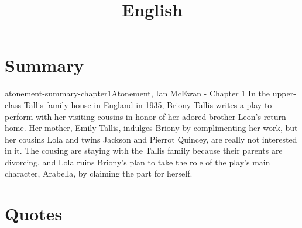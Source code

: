 \documentclass[preview]{standalone}
\begin{document}
\title{English}
\genpage

\section{Summary}

\begin{snippetsummary}{atonement-summary-chapter1}{Atonement, Ian McEwan - Chapter 1}
    In the upper-class Tallis family house in England in 1935,
    Briony Tallis writes a play to perform with her visiting
    cousins in honor of her adored brother Leon's return home.
    Her mother, Emily Tallis, indulges Briony by complimenting her work,
    but her cousins Lola and twins Jackson and Pierrot Quincey, are really
    not interested in it. The cousing are staying with the Tallis family
    because their parents are divorcing, and Lola ruins
    Briony's plan to take the role of the play's main character, Arabella, by
    claiming the part for herself.
\end{snippetsummary}

\section{Quotes}
\end{document}

